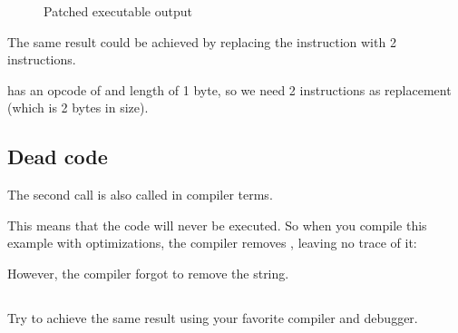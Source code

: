 \begin{figure}[H]
\centering
{}
\caption{Patched executable output}
\label{fig:goto_result}
\end{figure}

The same result could be achieved by replacing the \JMP instruction with 2 \NOP instructions.

\NOP has an opcode of  and length of 1 byte, so we need 2 instructions as \JMP replacement (which is 2 bytes in size).

\subsection{Dead code}

The second \printf call is also called  in compiler terms.

This means that the code will never be executed.
So when you compile this example with optimizations, the compiler removes , leaving
no trace of it:



However, the compiler forgot to remove the  string.


\subsection{\Exercise}


Try to achieve the same result using your favorite compiler and debugger.

